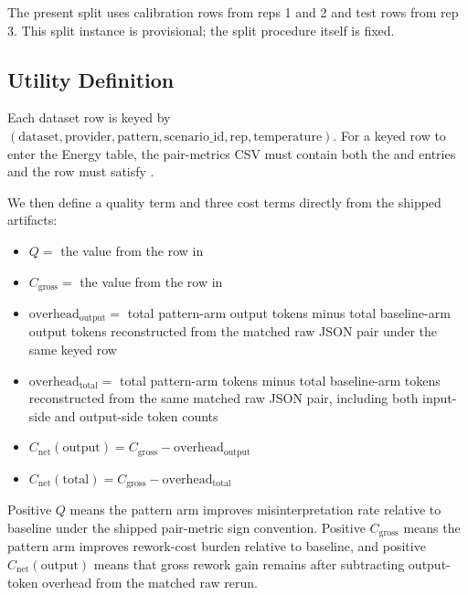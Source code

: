 \documentclass[11pt,a4paper]{article}
\begin{document}
The present split uses calibration rows from reps 1 and 2 and test rows from
rep 3. This split instance is provisional; the split procedure itself is fixed.

\subsection{Utility Definition}
\label{sec:utility}

Each dataset row is keyed by
\((\mathrm{dataset}, \mathrm{provider}, \mathrm{pattern}, \mathrm{scenario\_id}, \mathrm{rep}, \mathrm{temperature})\).
For a keyed row to enter the Energy table, the pair-metrics CSV must contain both
the  and  entries and
the row must satisfy .

We then define a quality term and three cost terms directly from the shipped
artifacts:
\begin{itemize}
  \item $Q =$ the  value from the
   row in 
  \item $C_{\mathrm{gross}} =$ the  value from the
   row in 
  \item $\mathrm{overhead}_{\mathrm{output}} =$ total pattern-arm output tokens
  minus total baseline-arm output tokens reconstructed from the matched raw JSON
  pair under the same keyed row
  \item $\mathrm{overhead}_{\mathrm{total}} =$ total pattern-arm tokens minus
  total baseline-arm tokens reconstructed from the same matched raw JSON pair,
  including both input-side and output-side token counts
  \item $C_{\mathrm{net}}(\mathrm{output}) = C_{\mathrm{gross}} - \mathrm{overhead}_{\mathrm{output}}$
  \item $C_{\mathrm{net}}(\mathrm{total}) = C_{\mathrm{gross}} - \mathrm{overhead}_{\mathrm{total}}$
\end{itemize}

Positive $Q$ means the pattern arm improves misinterpretation rate relative to
baseline under the shipped pair-metric sign convention. Positive
$C_{\mathrm{gross}}$ means the pattern arm improves rework-cost burden relative to
baseline, and positive \(C_{\mathrm{net}}(\mathrm{output})\) means that gross
rework gain remains after subtracting output-token overhead from the matched raw
rerun.
\end{document}

